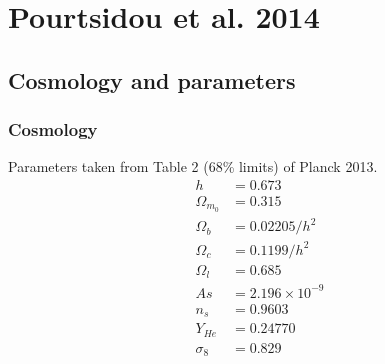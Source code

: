 \documentclass[12pt,a4paper]{article}
\begin{document}
\section{Pourtsidou et al. 2014}
\subsection{Cosmology and parameters}
\subsubsection{Cosmology}
Parameters taken from Table 2 (68\% limits) of Planck 2013. 
\begin{align*}
	h &= 0.673\\
	\Omega_{m_0} &= 0.315\\
	\Omega_{b} &= 0.02205/h^2\\
	\Omega_{c} &= 0.1199/h^2\\
	\Omega_{l} &= 0.685\\
	As &= 2.196\times 10^{-9}\\
	n_s &= 0.9603\\
	Y_{He} &= 0.24770\\
	\sigma_8 &= 0.829\\
\end{align*}
%
%
%
%
%
%
%
%
\end{document}
